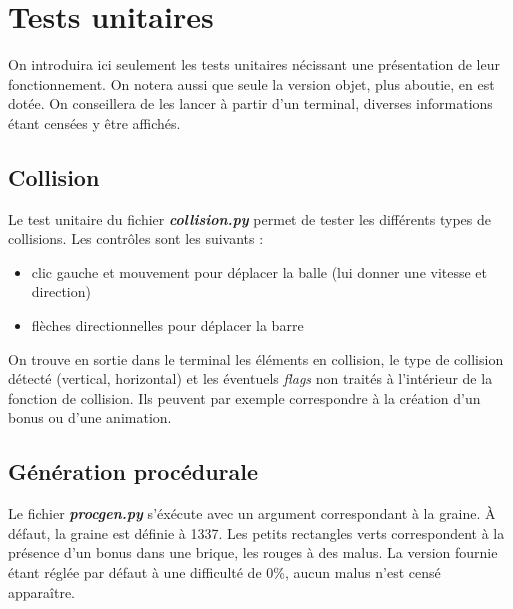 \section{Tests unitaires}
  On introduira ici seulement les tests unitaires nécissant une présentation de leur fonctionnement. On notera aussi que seule la version objet, plus aboutie, en est dotée. On conseillera de les lancer à partir d'un terminal, diverses informations étant censées y être affichés.

  \subsection{Collision}
    Le test unitaire du fichier {\em \bf collision.py} permet de tester les différents types de collisions. Les contrôles sont les suivants :
    \begin{itemize}
    \item clic gauche et mouvement pour déplacer la balle (lui donner une vitesse et direction)
    \item flèches directionnelles pour déplacer la barre
	\end{itemize}
	On trouve en sortie dans le terminal les éléments en collision, le type de collision détecté (vertical, horizontal) et les éventuels {\em flags} non traités à l'intérieur de la fonction de collision. Ils peuvent par exemple correspondre à la création d'un bonus ou d'une animation.

  \subsection{Génération procédurale}
	Le fichier {\em \bf procgen.py} s'éxécute avec un argument correspondant à la graine. À défaut, la graine est définie à 1337. Les petits rectangles verts correspondent à la présence d'un bonus dans une brique, les rouges à des malus. La version fournie étant réglée par défaut à une difficulté de 0\%, aucun malus n'est censé apparaître.
